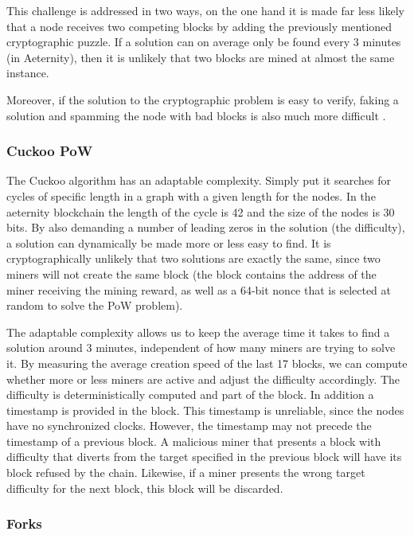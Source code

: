 This challenge is addressed in two ways, on the one hand it is made far
less likely that a node receives two competing blocks by adding the previously
mentioned cryptographic puzzle. If a solution can on average only be found
every 3 minutes (in Aeternity), then it is unlikely that two blocks are
mined at almost the same instance.

Moreover, if the solution to the
cryptographic problem is easy to verify, faking a solution and spamming the
node with bad blocks is also much more difficult
\cite{miningagainstspamming}.

\subsubsection{Cuckoo PoW}

The Cuckoo algorithm has an adaptable complexity. Simply put it
searches for cycles of specific length in a graph with a given length
for the nodes. In the aeternity blockchain the length of the cycle is 42 and the size
of the nodes is 30 bits. By also demanding a number of
leading zeros in the solution (the difficulty), a solution can dynamically be made
more or less easy to find. It is cryptographically unlikely that two
solutions are exactly the same, since two miners will not create the
same block (the block contains the address of the miner receiving the
mining reward, as well as a 64-bit nonce that is selected at random to
solve the PoW problem).

The adaptable complexity allows us to keep the average time it takes
to find a solution around 3 minutes, independent of how many miners
are trying to solve it. By measuring the average creation speed of the
last 17 blocks, we can compute whether more or less miners are active and adjust
the difficulty accordingly. The difficulty is deterministically
computed and part of the block. In addition a timestamp is provided in
the block. This timestamp is unreliable, since the nodes have no
synchronized clocks. However, the timestamp may not precede the
timestamp of a previous block. A malicious miner that presents a
block with difficulty that diverts from the target specified in the
previous block will have its block refused by the chain. Likewise, if
a miner presents the wrong target difficulty for the next block, this
block will be discarded.

\subsubsection{Forks}

